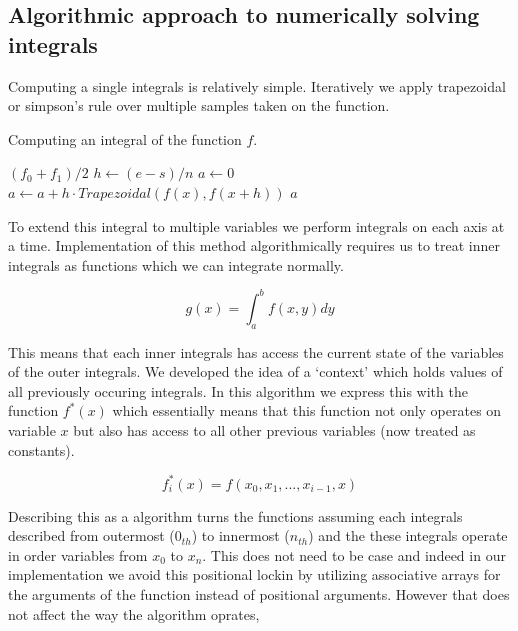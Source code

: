 \documentclass[12pt]{article}
\begin{document}
\subsection{Algorithmic approach to numerically solving integrals}

Computing a single integrals is relatively simple. Iteratively we apply trapezoidal or simpson's rule over multiple
samples taken on the function.

\begin{algorithm}
	\caption{Computing an integral of the function $f$.}
	\begin{algorithmic}[1]
		\State \Return $(f_0 + f_1)/2$
		\EndProcedure
		\Statex
		\State $h \gets (e - s) / n$
		\State $a \gets 0$
		\State $a \gets a + h \cdot Trapezoidal(f(x), f(x + h))$
		\EndFor
		\State \Return $a$
		\EndProcedure
	\end{algorithmic}
\end{algorithm}

To extend this integral to multiple variables we perform integrals on each axis at a time. Implementation of this method
algorithmically requires us to treat inner integrals as functions which we can integrate normally.

$$ g(x) = \int_a^b f(x, y) dy $$

This means that each inner integrals has access the current state of the variables of the outer integrals. We developed
the idea of a `context' which holds values of all previously occuring integrals. In this algorithm we express this with
the function $f^*(x)$ which essentially means that this function not only operates on variable $x$ but also has access
to all other previous variables (now treated as constants).

$$ f^*_i(x) = f(x_0, x_1, ..., x_{i-1}, x)$$

Describing this as a algorithm turns the functions assuming each integrals described from outermost ($0_{th}$) to innermost ($n_{th}$) and the 
these integrals operate in order variables from $x_0$ to $x_n$. This does not need to be case and indeed in our implementation we avoid this
positional lockin by utilizing associative arrays for the arguments of the function instead of positional arguments. However that does not affect
the way the algorithm oprates,
\end{document}

